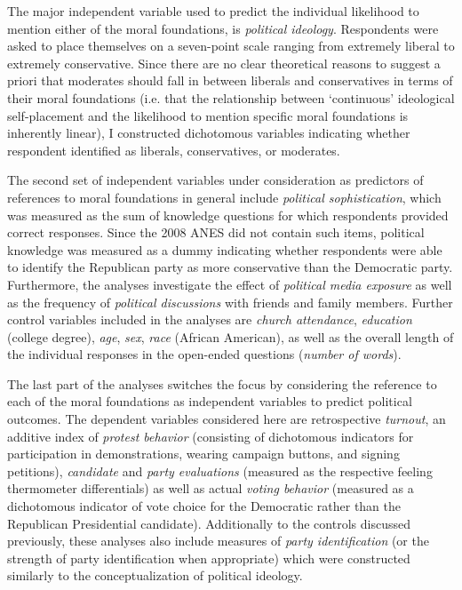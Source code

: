 \documentclass[12pt]{article}
\begin{document}
The major independent variable used to predict the individual likelihood to mention either of the moral foundations, is \textit{political ideology}. Respondents were asked to place themselves on a seven-point scale ranging from extremely liberal to extremely conservative. Since there are no clear theoretical reasons to suggest a priori that moderates should fall in between liberals and conservatives in terms of their moral foundations (i.e. that the relationship between `continuous' ideological self-placement and the likelihood to mention specific moral foundations is inherently linear), I constructed dichotomous variables indicating whether respondent identified as liberals, conservatives, or moderates.

The second set of independent variables under consideration as predictors of references to moral foundations in general include \textit{political sophistication}, which was measured as the sum of knowledge questions for which respondents provided correct responses. Since the 2008 ANES did not contain such items, political knowledge was measured as a dummy indicating whether respondents were able to identify the Republican party as more conservative than the Democratic party. Furthermore, the analyses investigate the effect of \textit{political media exposure} as well as the frequency of \textit{political discussions} with friends and family members. Further control variables included in the analyses are \textit{church attendance}, \textit{education} (college degree), \textit{age}, \textit{sex}, \textit{race} (African American), as well as the overall length of the individual responses in the open-ended questions (\textit{number of words}).

The last part of the analyses switches the focus by considering the reference to each of the moral foundations as independent variables to predict political outcomes. The dependent variables considered here are retrospective \textit{turnout}, an additive index of \textit{protest behavior} (consisting of dichotomous indicators for participation in demonstrations, wearing campaign buttons, and signing petitions), \textit{candidate} and \textit{party evaluations} (measured as the respective feeling thermometer differentials) as well as actual \textit{voting behavior} (measured as a dichotomous indicator of vote choice for the Democratic rather than the Republican Presidential candidate). Additionally to the controls discussed previously, these analyses also include measures of \textit{party identification} (or the strength of party identification when appropriate) which were constructed similarly to the conceptualization of political ideology.
\end{document}

